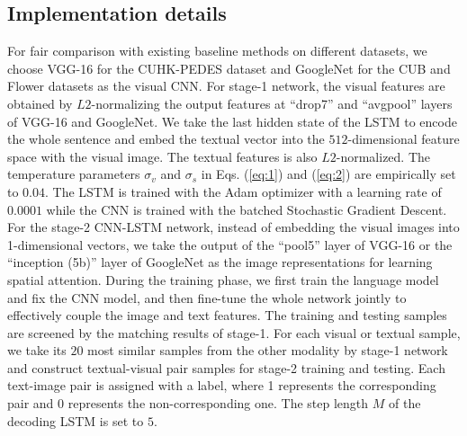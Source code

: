 \subsection{Implementation details}
For fair comparison with existing baseline methods on different datasets, we choose VGG-16 \cite{simonyan2014very} for the CUHK-­PEDES dataset and GoogleNet \cite{szegedy2015going} for the CUB and Flower datasets as the visual CNN. For stage-1 network, the visual features are obtained by $L2$-normalizing the output features at ``drop7'' and ``avgpool'' layers of VGG-16 and GoogleNet.
We take the last hidden state of the LSTM to encode the whole sentence and embed the textual vector into the $512$-dimensional feature space with the visual image. The textual features is also $L2$-normalized.
The temperature parameters $\sigma_v$ and $\sigma_s$ in Eqs. (\ref{eq:1}) and (\ref{eq:2}) are empirically set to $0.04$. The LSTM is trained with the Adam optimizer with a learning rate of $0.0001$ while the CNN is trained with the batched Stochastic Gradient Descent.
For the stage-2 CNN-LSTM network, instead of embedding the visual images into 1-dimensional vectors, we take the output of the ``pool5'' layer of VGG-16 or the ``inception (5b)'' layer of GoogleNet as the image representations for learning spatial attention.
During the training phase, we first train the language model and fix the CNN model, and then fine-tune the whole network jointly to effectively couple the image and text features. The training and testing samples are screened by the matching results of stage-1. For each visual or textual sample, we take its $20$ most similar samples from the other modality by stage-1 network and construct textual-visual pair samples for stage-2 training and testing. Each text-image pair is assigned with a label, where 1 represents the corresponding pair and 0 represents the non-corresponding one.
The step length $M$ of the decoding LSTM is set to $5$.


